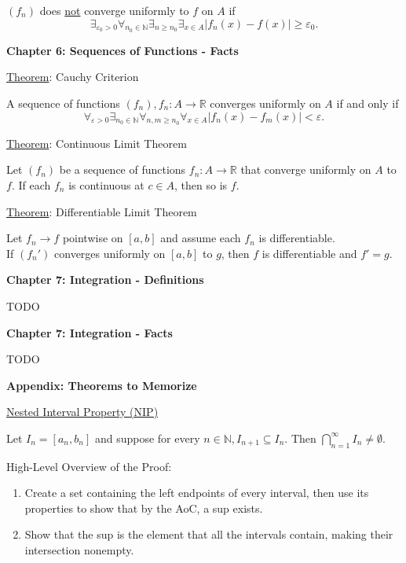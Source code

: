 \documentclass[12pt]{article}
\newcommand{\RR}{\mathbb{R}} %
\newcommand{\NN}{\mathbb{N}}
\newcommand\abs[1]{\left| #1 \right|} %
\newcommand{\eps}{\varepsilon}
\begin{document}
$(f_n)$ does \underline{not} converge uniformly to $f$ on $A$ if
\[
\exists_{\eps_0 > 0} \forall_{n_0 \in \NN} \exists_{n \ge n_0} \exists_{x \in A} \abs{f_n (x) - f(x)} \ge \eps_0.
\]

\pagebreak

\textbf{Chapter 6: Sequences of Functions - Facts}

\hrulefill

\underline{Theorem}: Cauchy Criterion

A sequence of functions $(f_n), f_n : A \rightarrow \RR$ converges uniformly on $A$ if and only if
\[
\forall_{\eps > 0} \exists_{n_0 \in \NN} \forall_{n, m \ge n_0} \forall_{x \in A} \abs{f_n (x) - f_m (x)} < \eps.
\]

\hrulefill

\underline{Theorem}: Continuous Limit Theorem

Let $(f_n)$ be a sequence of functions $f_n : A \rightarrow \RR$ that converge uniformly on $A$ to $f$. If each $f_n$ is continuous at $c \in A$, then so is $f$.

\hrulefill

\underline{Theorem}: Differentiable Limit Theorem

Let $f_n \rightarrow f$ pointwise on $[a, b]$ and assume each $f_n$ is differentiable.
\\
If $(f_n ')$ converges uniformly on $[a, b]$ to $g$, then $f$ is differentiable and $f' = g$.

\pagebreak

\textbf{Chapter 7: Integration - Definitions}

\hrulefill

TODO

\pagebreak

\textbf{Chapter 7: Integration - Facts}

\hrulefill

TODO

\pagebreak

\textbf{Appendix: Theorems to Memorize}

\hrulefill

\underline{Nested Interval Property (NIP)}

Let $I_n = [a_n, b_n]$ and suppose for every $n \in \NN, I_{n + 1} \subseteq {I_n}$. Then $\bigcap_{n = 1}^{\infty} I_n \ne \emptyset$.

\dotfill

High-Level Overview of the Proof:
\begin{enumerate}
\item Create a set containing the left endpoints of every interval, then use its properties to show that by the AoC, a sup exists.

\item Show that the sup is the element that all the intervals contain, making their intersection nonempty.
\end{enumerate}
\end{document}
